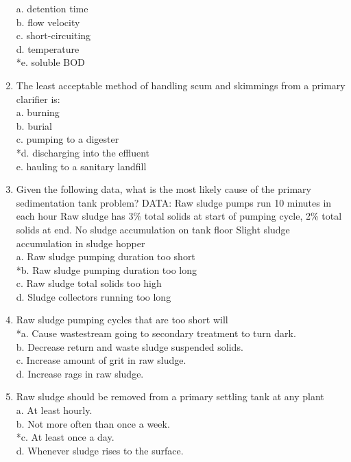 \begin{enumerate}
a. detention time \\
b. flow velocity \\
c. short-circuiting \\
d. temperature \\
*e. soluble BOD \\


\item  The least acceptable method of handling scum and skimmings from a primary clarifier is: \\

a. burning \\
b. burial \\
c. pumping to a digester \\
*d. discharging into the effluent \\
e. hauling to a sanitary landfill \\


\item  Given the following data, what is the most likely cause of the primary sedimentation tank problem?
DATA: Raw sludge pumps run 10 minutes in each hour
Raw sludge has 3\% total solids at start of pumping cycle, 2\% total solids at end.
No sludge accumulation on tank floor
Slight sludge accumulation in sludge hopper \\

a. Raw sludge pumping duration too short \\
*b. Raw sludge pumping duration too long \\
c. Raw sludge total solids too high \\
d. Sludge collectors running too long \\


\item  Raw sludge pumping cycles that are too short will \\

*a. Cause wastestream going to secondary treatment to turn dark. \\
b. Decrease return and waste sludge suspended solids. \\
c. Increase amount of grit in raw sludge. \\
d. Increase rags in raw sludge. \\


\item  Raw sludge should be removed from a primary settling tank at any plant \\

a. At least hourly. \\
b. Not more often than once a week. \\
*c. At least once a day. \\
d. Whenever sludge rises to the surface. \\


\end{enumerate}
